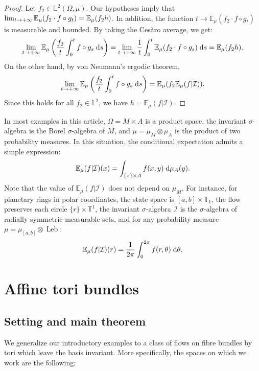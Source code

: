 \documentclass[AHL,Unicode,longabstracts]{cedram}
\DeclareMathOperator{\Leb}{Leb}
\newcommand{\Ebb}{\mathbb{E}}
\newcommand{\Lbb}{\mathbb{L}}
\newcommand{\Tbb}{\mathbb{T}}
\newcommand{\Ical}{\mathcal{I}}
\newcommand{\dd}{\;{\rm d}}
\begin{document}
\begin{proof}
Let $f_2 \in \Lbb^2 (\Omega, \mu)$. Our hypotheses imply that $\lim_{t \to + \infty} \Ebb_\mu (f_2 \cdot f \circ g_t)\linebreak= \Ebb_\mu (f_2 h)$. In addition, the function $t \to \Ebb_\mu (f_2 \cdot f \circ g_t)$ is measurable and bounded. By taking the Cesàro average, we get:
\[
\lim_{t \to + \infty} \Ebb_\mu \left(\frac{f_2}{t} \int_0^t f \circ g_s \dd s \right) = \lim_{t \to + \infty} \frac{1}{t} \int_0^t \Ebb_\mu (f_2 \cdot f \circ g_s) \dd s = \Ebb_\mu (f_2 h).
\]
On the other hand, by von Neumann's ergodic theorem,
\[
\lim_{t \to + \infty} \Ebb_\mu \left(\frac{f_2}{t} \int_0^t f \circ g_s \dd s \right) = \Ebb_\mu (f_2 \Ebb_\mu (f | \Ical)).
\]
Since this holds for all $f_2 \in \Lbb^2$, we have $h = \Ebb_\mu (f | \Ical)$.
\end{proof}



\begin{rema}

In most examples in this article, $\Omega = M \times A$ is a product space, the invariant $\sigma$-algebra is the Borel $\sigma$-algebra of $M$, and $\mu = \mu_M \otimes \mu_A$ is the product of two probability measures. In this situation, the conditional expectation admits a simple expression:
\[
\Ebb_\mu (f | \Ical) (x) = \int_{\{x\} \times A} f(x,y) \dd \mu_A (y).
\]
Note that the value of $\Ebb_\mu (f | \Ical)$ does not depend on $\mu_M$. For instance, for planetary rings in polar coordinates, the state space is $[a,b] \times \Tbb_1$, the flow preserves each circle $\{r\} \times \Tbb^1$, the invariant $\sigma$-algebra $\Ical$ is the $\sigma$-algebra of radially symmetric measurable sets, and for any probability measure $\mu = \mu_{[a,b]} \otimes \Leb$:
\[
\Ebb_\mu (f | \Ical) (r) = \frac{1}{2\pi} \int_0^{2 \pi} f(r,\theta) \dd \theta.
\]
\end{rema}


\section{Affine tori bundles}\label{sec:FibreBundle}

\subsection{Setting and main theorem}\label{subsec:TheoremePrincipal}


We generalize our introductory examples to a class of flows on fibre bundles by tori which leave the basis invariant. More specifically, the spaces on which we work are the following:
\end{document}
